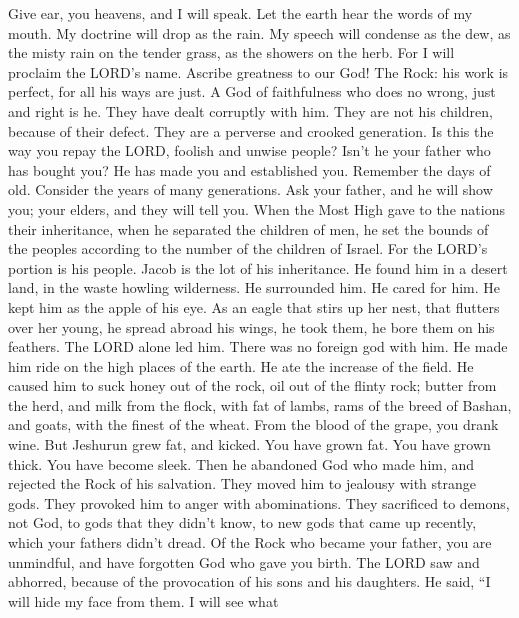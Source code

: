  Give ear, you heavens, and I will speak. Let the earth hear
the words of my mouth.  My doctrine will drop as the rain.
My speech will condense as the dew, as the misty rain on the tender
grass, as the showers on the herb.  For I will proclaim the
LORD's name. Ascribe greatness to our God!  The Rock: his
work is perfect, for all his ways are just. A God of faithfulness who
does no wrong, just and right is he.  They have dealt
corruptly with him. They are not his children, because of their defect.
They are a perverse and crooked generation.  Is this the way
you repay the LORD, foolish and unwise people? Isn't he your father who
has bought you? He has made you and established you. 
Remember the days of old. Consider the years of many generations. Ask
your father, and he will show you; your elders, and they will tell you.
 When the Most High gave to the nations their inheritance,
when he separated the children of men, he set the bounds of the peoples
according to the number of the children of Israel.  For the
LORD's portion is his people. Jacob is the lot of his inheritance.
 He found him in a desert land, in the waste howling
wilderness. He surrounded him. He cared for him. He kept him as the
apple of his eye.  As an eagle that stirs up her nest, that
flutters over her young, he spread abroad his wings, he took them, he
bore them on his feathers.  The LORD alone led him. There
was no foreign god with him.  He made him ride on the high
places of the earth. He ate the increase of the field. He caused him to
suck honey out of the rock, oil out of the flinty rock; 
butter from the herd, and milk from the flock, with fat of lambs, rams
of the breed of Bashan, and goats, with the finest of the wheat. From
the blood of the grape, you drank wine.  But Jeshurun grew
fat, and kicked. You have grown fat. You have grown thick. You have
become sleek. Then he abandoned God who made him, and rejected the Rock
of his salvation.  They moved him to jealousy with strange
gods. They provoked him to anger with abominations.  They
sacrificed to demons, not God, to gods that they didn't know, to new
gods that came up recently, which your fathers didn't dread.
 Of the Rock who became your father, you are unmindful, and
have forgotten God who gave you birth.  The LORD saw and
abhorred, because of the provocation of his sons and his daughters.
 He said, ``I will hide my face from them. I will see what

